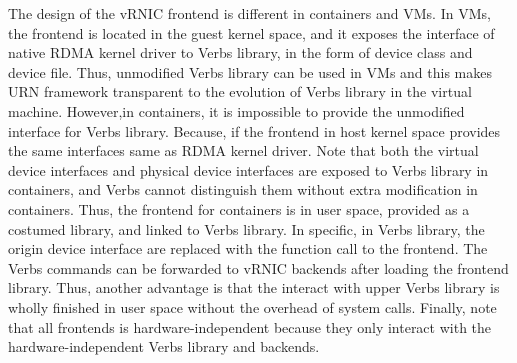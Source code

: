 The design of the vRNIC frontend is different in containers and VMs. In VMs, the frontend is located in the guest kernel space, and it exposes the interface of native RDMA kernel driver to Verbs library, in the form of device class and device file. Thus, unmodified Verbs library can be used in VMs and this makes URN framework transparent to the evolution of Verbs library in the virtual machine.
However,in containers, it is impossible to provide the unmodified interface for Verbs library. Because, if the frontend in host kernel space provides the same interfaces same as RDMA kernel driver. Note that both the virtual device interfaces and physical device interfaces are exposed to Verbs library in containers, and Verbs cannot distinguish them without extra modification in containers.  
Thus, the frontend for containers is in user space, provided as a costumed library, and linked to Verbs library. In specific, in Verbs library, the origin device interface are replaced with the function call to the frontend. The Verbs commands can be forwarded to vRNIC backends after loading the frontend library. 
Thus, another advantage is that the interact with upper Verbs library is wholly finished in user space without the overhead of system calls. Finally, note that all frontends is hardware-independent because they only interact with the hardware-independent Verbs library and backends.


